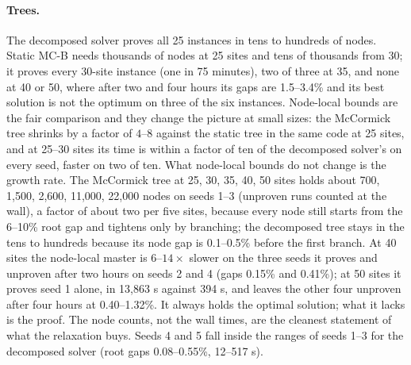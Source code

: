 \documentclass[11pt]{article}
\begin{document}
\paragraph{Trees.} The decomposed solver proves all 25 instances in tens to hundreds of nodes. Static
\textsc{MC-B} needs thousands of nodes at 25 sites and tens of thousands from 30; it proves every 30-site instance
(one in 75 minutes), two of three at 35, and none at 40 or 50, where after two and four hours its gaps are
1.5--3.4\% and its best solution is not the optimum on three of the six instances. Node-local bounds are the fair
comparison and they change the picture at small sizes: the McCormick tree shrinks by a factor of $4$--$8$ against
the static tree in the same code at 25 sites, and at 25--30 sites its time is within a factor of ten of the
decomposed solver's on every seed, faster on two of ten. What node-local bounds do not change is the growth rate. The
McCormick tree at 25, 30, 35, 40, 50 sites holds about 700, 1,500, 2,600, 11,000, 22,000 nodes on seeds 1--3
(unproven runs counted at the wall), a factor of about two per five sites, because every node still starts from the
6--10\% root gap and tightens only by branching; the decomposed tree stays in the tens to hundreds because its node
gap is 0.1--0.5\% before the first branch. At 40 sites the node-local master is $6$--$14\times$ slower on the three
seeds it proves and unproven after two hours on seeds 2 and 4 (gaps 0.15\% and 0.41\%); at 50 sites it proves seed
1 alone, in 13,863 s against 394 s, and leaves the other four unproven after four hours at 0.40--1.32\%. It always
holds the optimal solution; what it lacks is the proof. The node counts, not the wall times, are the cleanest statement
of what the relaxation buys. Seeds 4 and 5 fall inside the ranges of seeds 1--3 for the decomposed solver (root gaps
0.08--0.55\%, 12--517 s).
\end{document}
